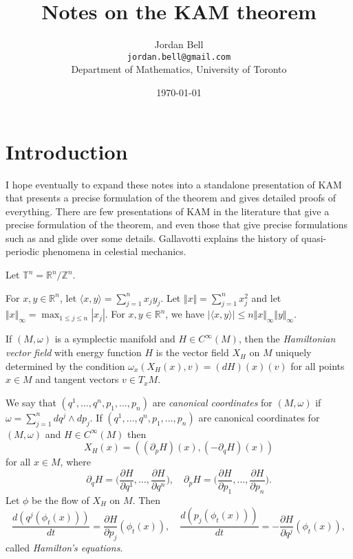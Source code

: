 \documentclass{article}
\newcommand{\norm}[1]{\Vert #1 \Vert}
\begin{document}
\title{Notes on the KAM theorem}
\author{Jordan Bell\\ \texttt{jordan.bell@gmail.com}\\Department of Mathematics, University of Toronto}
\date{\today}              

\maketitle

\section{Introduction}
I hope eventually to expand these notes into a standalone presentation of KAM that presents a precise formulation of the theorem and gives detailed proofs of everything. There are few presentations of KAM in the literature that
give a precise formulation of the theorem, and even those that give precise
formulations such as \cite{MR2026200} and \cite{poeschel} glide over
some details. Gallavotti \cite{gallavotti} explains the history of quasi-periodic phenomena in celestial mechanics.

Let $\mathbb{T}^n=\mathbb{R}^n/\mathbb{Z}^n$.

For $x,y \in \mathbb{R}^n$, let $\langle x,y \rangle = \sum_{j=1}^n x_j y_j$.
Let $\norm{x}=\sum_{j=1}^n x_j^2$ and let $\norm{x}_\infty=\max_{1 \leq j \leq n} |x_j|$. For $x,y \in \mathbb{R}^n$, we have $|\langle x,y \rangle|
\leq n \norm{x}_\infty \norm{y}_\infty$.

If $(M,\omega)$ is a symplectic manifold and $H \in C^\infty(M)$, then the
{\em Hamiltonian vector field} with energy function $H$ is the vector
field $X_H$ on $M$ uniquely determined by the condition $\omega_x (X_H(x),v)=(dH)(x)(v)$ for all points $x \in M$ and tangent vectors $v \in T_x M$.

We say that $(q^1,\ldots,q^n,p_1,\ldots,p_n)$ are {\em canonical coordinates}
for $(M,\omega)$ if $\omega=\sum_{j=1}^n dq^j \wedge dp_j$. If
$(q^1,\ldots,q^n,p_1,\ldots,p_n)$ are canonical coordinates for $(M,\omega)$
and $H \in C^\infty(M)$ then
\[
X_H(x)=((\partial_p H)(x),(-\partial_q H)(x))
\]
for all $x \in M$, where
\[
\partial_q H=\Big( \frac{\partial H}{\partial q^1},\ldots,\frac{\partial H}{\partial q^n} \Big), \quad \partial_p H=\Big( \frac{\partial H}{\partial p_1},\ldots,\frac{\partial H}{\partial p_n} \Big).
\]
Let $\phi$ be the flow of $X_H$ on $M$. Then
\[
\frac{d(q^j(\phi_t(x)))}{dt}=\frac{\partial H}{\partial p_j}(\phi_t(x)),
\quad \frac{d(p_j(\phi_t(x)))}{dt}=-\frac{\partial H}{\partial q^j}(\phi_t(x)),
\]
called {\em Hamilton's equations}.
\end{document}
